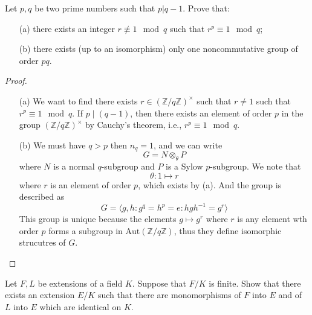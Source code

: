 \documentclass[openany]{book}
\newcommand{\Z}{\mathbb{Z}}
\newcommand{\la}{\langle}
\newcommand{\ra}{\rangle}
\begin{document}
\begin{prob}
    Let \(p,q\) be two prime numbers such that \(p|q-1\). Prove that:
    \begin{itemize}
        \item[(a)] there exists an integer \(r\not\equiv 1\mod q\) such that \(r^{p}\equiv 1\mod q\);
        \item[(b)] there exists (up to an isomorphism) only one noncommutative group of order \(pq\).
    \end{itemize}
\end{prob}
\begin{proof}
    \begin{itemize}
        \item[(a)] We want to find there exists $r\in (\Z/q\Z)^\times$ such that $r\neq 1$ such that $r^p\equiv 1\mod q$. If $p\mid(q-1)$, then there exists an element of order $p$ in the group $(\Z/q\Z)^\times$ by Cauchy's theorem, i.e., $r^{p}\equiv 1\mod q$.
        \item[(b)] We must have $q>p$ then $n_q=1$, and we can write 
        \begin{equation*}
            G=N\otimes_\theta P
        \end{equation*}
        where $N$ is a normal $q$-subgroup and $P$ is a Sylow $p$-subgroup. We note that 
        \begin{equation*}
            \theta: 1\mapsto r
        \end{equation*}
        where $r$ is an element of order $p$, which exists by (a). And the group is described as 
        \begin{equation*}
            G=\la g,h: g^q=h^p=e: hgh^{-1}=g^{r}\ra
        \end{equation*}
        This group is unique because the elements $g\mapsto g^r$ where $r$ is any element wth order $p$ forms a subgroup in $\text{Aut}(\Z/q\Z)$, thus they define isomorphic strucutres of $G$.
    \end{itemize}
\end{proof}


\begin{prob}
    Let \(F,L\) be extensions of a field \(K\). Suppose that \(F/K\) is finite. Show that there exists an extension \(E/K\) such that there are monomorphisms of \(F\) into \(E\) and of \(L\) into \(E\) which are identical on \(K\).
\end{prob}
\end{document}
